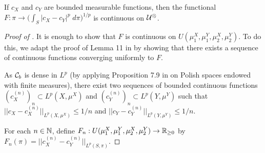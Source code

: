 \begin{lemma} \label{lemma:coot_continuous}
    If $c_X$ and $c_Y$ are bounded measurable functions, then
    the functional $F: \pi \to \Big( \int_{S} \vert c_X - c_Y \vert^p \; d\pi \Big)^{1/p}$ is continuous on $\mathcal U^{\otimes}$.
\end{lemma}
\begin{proof}[Proof of ]
  It is enough to show that $F$ is continuous on $U(\mu_1^X, \mu_1^Y, \mu_2^X, \mu_2^Y)$.
  To do this, we adapt the proof of Lemma 11 in \citep{Chowdhury19} by showing that
  there exists a sequence of continuous functions converging uniformly to $F$.

  As $\mathcal C_b$ is dense in $L^p$ (by applying Proposition 7.9 in \citep{Folland99}
  on Polish spaces endowed with finite measures), there exist two sequences of
  bounded continuous functions $(c_X^{(n)})_n \subset L^p(X, \mu^X)$ and
  $(c_Y^{(n)})_n \subset L^p(Y, \mu^Y)$ such that
  $\vert\vert c_X - c_X^{(n)} \vert\vert_{L^p(X, \mu^X)} \leq 1/n$ and
  $\vert\vert c_Y - c_Y^{(n)} \vert\vert_{L^p(Y, \mu^Y)} \leq 1/n$.

  For each $n \in \mathbb N$, define $F_n: U(\mu_1^X, \mu_1^Y, \mu_2^X, \mu_2^Y) \to \mathbb R_{\geq 0}$
  by $F_n(\pi) = \vert\vert c_X^{(n)} - c_Y^{(n)} \vert\vert_{L^p(S, \pi)}$.


\end{proof}
